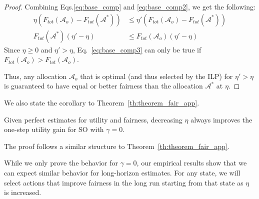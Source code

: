 \begin{proof}
Combining Eqs.\ref{eq:base_comp} and \ref{eq:base_comp2}, we get the following:
\begin{align}
    \eta (F_{tot}(\mathcal{A}_o) - F_{tot}(\mathcal{A}^*)) &\le  \eta' (F_{tot}(\mathcal{A}_o) - F_{tot}(\mathcal{A}^*)) \\
    F_{tot}(\mathcal{A}^*)(\eta'-\eta) &\le F_{tot}(\mathcal{A}_o)(\eta'-\eta) \label{eq:base_comp3} 
\end{align}
Since $\eta\ge0$ and $\eta'>\eta$, Eq.~\ref{eq:base_comp3} can only be true if $F_{tot}(\mathcal{A}_o)>F_{tot}(\mathcal{A}_o)$.

Thus, any allocation $\mathcal{A}_o$ that is optimal (and thus selected by the ILP) for $\eta'>\eta$ is guaranteed to have equal or better fairness than the allocation $\mathcal{A}^*$ at $\eta$.
\end{proof}

We also state the corollary to Theorem~\ref{th:theorem_fair_app}.
\begin{corollary}
Given perfect estimates for utility and fairness, decreasing $\eta$ always improves the one-step utility gain for SO with $\gamma=0$.
\label{th:theorem_util_app}
\end{corollary}
The proof follows a similar structure to Theorem~\ref{th:theorem_fair_app}.

While we only prove the behavior for $\gamma=0$, our empirical results show that we can expect similar behavior for long-horizon estimates. For any state, we will select actions that improve fairness in the long run starting from that state as $\eta$ is increased.

